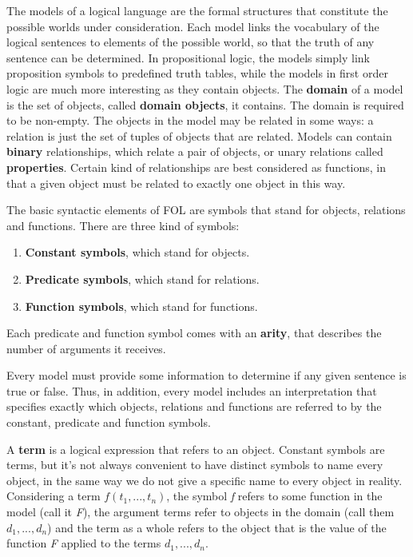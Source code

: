 \documentclass{article}
\begin{document}
The models of a logical language are the formal structures that constitute the possible worlds under consideration. Each model links the vocabulary of the logical sentences to elements of the possible world, so that the truth of any sentence can be determined. In propositional logic, the models simply link proposition symbols to predefined truth tables, while the models in first order logic are much more interesting as they contain objects.
The \textbf{domain} of a model is the set of objects, called \textbf{domain objects}, it contains. The domain is required to be non-empty. The objects in the model may be related in some ways: a relation is just the set of tuples of objects that are related. Models can contain \textbf{binary} relationships, which relate a pair of objects, or unary relations called \textbf{properties}. Certain kind of relationships are best considered as functions, in that a given object must be related to exactly one object in this way.

The basic syntactic elements of FOL are symbols that stand for objects, relations and functions. There are three kind of symbols:
\begin{enumerate}
    \item \textbf{Constant symbols}, which stand for objects.
    \item \textbf{Predicate symbols}, which stand for relations.
    \item \textbf{Function symbols}, which stand for functions.
\end{enumerate}
\noindent Each predicate and function symbol comes with an \textbf{arity}, that describes the number of arguments it receives.

Every model must provide some information to determine if any given sentence is true or false. Thus, in addition, every model includes an interpretation that specifies exactly which objects, relations and functions are referred to by the constant, predicate and function symbols.

A \textbf{term} is a logical expression that refers to an object. Constant symbols are terms, but it's not always convenient to have distinct symbols to name every object, in the same way we do not give a specific name to every object in reality. Considering a term $f(t_1, ..., t_n)$, the symbol \textit{f} refers to some function in the model (call it \textit{F}), the argument terms refer to objects in the domain (call them $d_1, ...,d_n$) and the term as a whole refers to the object that is the value of the function \textit{F} applied to the terms $d_1, ...,d_n$.
\end{document}

